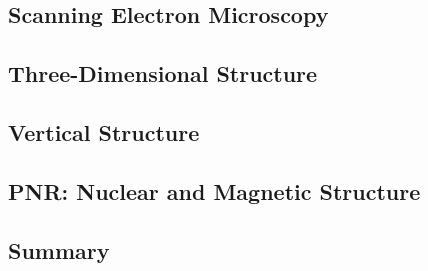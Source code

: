 \documentclass[\main/dresen_thesis.tex]{subfiles}
\renewcommand{\thisPath}{\main/chapters/colloidalCrystals/colloidalCrystals}
\begin{document}
  \subsection{Scanning Electron Microscopy}
  
    \FloatBarrier

  \subsection{Three-Dimensional Structure}
  
    \FloatBarrier

  \subsection{Vertical Structure}
  
    \FloatBarrier

  \subsection{PNR: Nuclear and Magnetic Structure}
  
    \FloatBarrier

  \clearpage
  \subsection{Summary}
  
    \FloatBarrier
\end{document}
